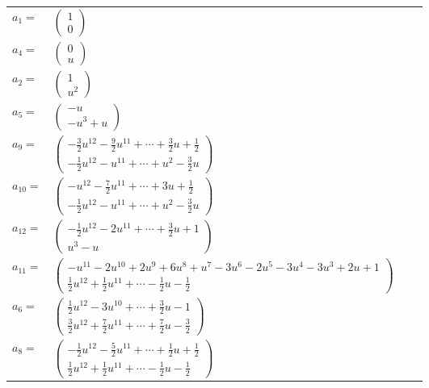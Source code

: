 \documentclass[1p]{elsarticle_modified}
\theoremstyle{definition}
\begin{document}
\begin{tabular}{m{7pt} m{180pt} m{7pt} m{180pt} }
\flushright $a_{1}=$&$\begin{pmatrix}1\\0\end{pmatrix}$ \\
\flushright $a_{4}=$&$\begin{pmatrix}0\\u\end{pmatrix}$ \\
\flushright $a_{2}=$&$\begin{pmatrix}1\\u^2\end{pmatrix}$ \\
\flushright $a_{5}=$&$\begin{pmatrix}- u\\- u^3+u\end{pmatrix}$ \\
\flushright $a_{9}=$&$\begin{pmatrix}-\frac{3}{2} u^{12}-\frac{9}{2} u^{11}+\cdots+\frac{3}{2} u+\frac{1}{2}\\-\frac{1}{2} u^{12}- u^{11}+\cdots+u^2-\frac{3}{2} u\end{pmatrix}$ \\
\flushright $a_{10}=$&$\begin{pmatrix}- u^{12}-\frac{7}{2} u^{11}+\cdots+3 u+\frac{1}{2}\\-\frac{1}{2} u^{12}- u^{11}+\cdots+u^2-\frac{3}{2} u\end{pmatrix}$ \\
\flushright $a_{12}=$&$\begin{pmatrix}-\frac{1}{2} u^{12}-2 u^{11}+\cdots+\frac{3}{2} u+1\\u^3- u\end{pmatrix}$ \\
\flushright $a_{11}=$&$\begin{pmatrix}- u^{11}-2 u^{10}+2 u^9+6 u^8+u^7-3 u^6-2 u^5-3 u^4-3 u^3+2 u+1\\\frac{1}{2} u^{12}+\frac{1}{2} u^{11}+\cdots-\frac{1}{2} u-\frac{1}{2}\end{pmatrix}$ \\
\flushright $a_{6}=$&$\begin{pmatrix}\frac{1}{2} u^{12}-3 u^{10}+\cdots+\frac{3}{2} u-1\\\frac{3}{2} u^{12}+\frac{7}{2} u^{11}+\cdots+\frac{7}{2} u-\frac{3}{2}\end{pmatrix}$ \\
\flushright $a_{8}=$&$\begin{pmatrix}-\frac{1}{2} u^{12}-\frac{5}{2} u^{11}+\cdots+\frac{1}{2} u+\frac{1}{2}\\\frac{1}{2} u^{12}+\frac{1}{2} u^{11}+\cdots-\frac{1}{2} u-\frac{1}{2}\end{pmatrix}$ \\

\end{tabular}
\end{document}
